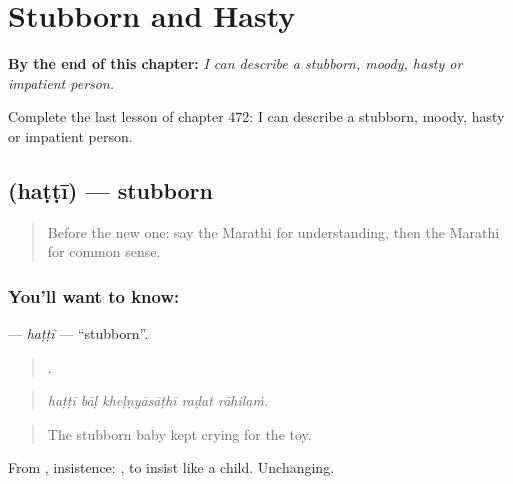 
\chapter{Stubborn and Hasty}
\label{ch:mr-stubborn-and-hasty}

\begin{chapteropening}
\textbf{By the end of this chapter:} \emph{I can describe a stubborn, moody, hasty or impatient person.}

Complete the last lesson of chapter 472: I can describe a stubborn, moody, hasty or impatient person.
\end{chapteropening}

\section[\texorpdfstring{\mr{हट्टी} (haṭṭī)}{हट्टी (haṭṭī)}]{ (haṭṭī) — stubborn}

\label{lesson:MR-C472-hatti}



\begin{quote}
Before the new one: say the Marathi for understanding, then the Marathi for common sense.
\end{quote}

\subsection*{You'll want to know: }
\textbf{} — \emph{haṭṭī} — \textquotedblleft{}stubborn\textquotedblright{}.

\begin{quote}
    .
\end{quote}

\begin{quote}
\emph{haṭṭī bāḷ kheḷṇyāsāṭhī raḍat rāhilaṁ.}
\end{quote}

\begin{quote}
The stubborn baby kept crying for the toy.
\end{quote}

From , insistence:  , to insist like a child. Unchanging.

